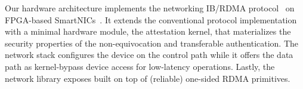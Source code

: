 Our \projecttitle{} hardware architecture implements the networking IB/RDMA protocol~\cite{rdma_specification} on FPGA-based SmartNICs~\cite{u280_smartnics}. 
It extends the conventional protocol implementation with a minimal hardware module, the attestation kernel, that materializes the security properties of the non-equivocation and transferable authentication. The \projecttitle{} network stack configures the \projecttitle{} device on the control path while it offers the data path as kernel-bypass device access for low-latency operations. Lastly, the  \projecttitle{} network library exposes  built on top of (reliable) one-sided RDMA primitives. 







